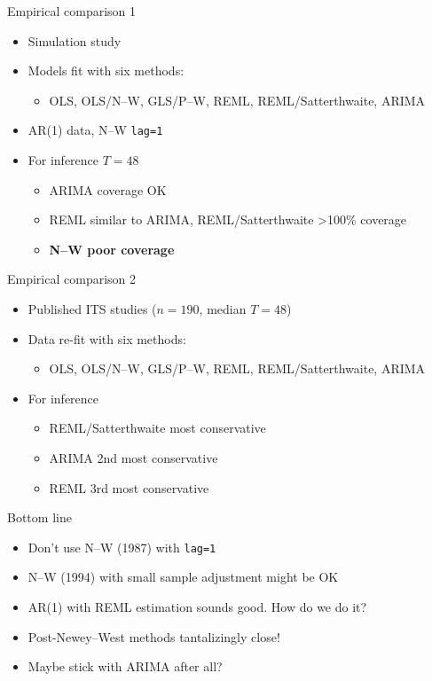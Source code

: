 \documentclass[aspectratio=169,12pt]{beamer} %
\begin{document}
\begin{frame}{Empirical comparison 1}
	\begin{itemize}
		\item Simulation study
		\item Models fit with six methods:
		\begin{itemize}
			\item OLS, OLS/N--W, GLS/P--W, REML, REML/Satterthwaite, ARIMA
		\end{itemize}
		\item AR(1) data, N--W \texttt{lag=1}
		\item For inference \( T=48 \)
		\begin{itemize}
			\item ARIMA coverage OK
			\item REML similar to ARIMA, REML/Satterthwaite >100\% coverage
			\item \textbf{N--W poor coverage}
		\end{itemize}
	\end{itemize}
\end{frame}

\begin{frame}{Empirical comparison 2}
	\begin{itemize}
		\item Published ITS studies (\( n=190 \), median \(T=48\))
		\item Data re-fit with six methods:
		\begin{itemize}
			\item OLS, OLS/N--W, GLS/P--W, REML, REML/Satterthwaite, ARIMA
		\end{itemize}
		\item For inference
		\begin{itemize}
			\item REML/Satterthwaite most conservative
			\item ARIMA 2nd most conservative
			\item REML 3rd most conservative
		\end{itemize}
	\end{itemize}
\end{frame}

\begin{frame}{Bottom line}
    \begin{itemize}
        \item Don't use N--W (1987) with \texttt{lag=1}
        \item N--W (1994) with small sample adjustment might be OK
		\item AR(1) with REML estimation sounds good. How do we do it?
        \item Post-Newey--West methods tantalizingly close!
		\item Maybe stick with ARIMA after all?
    \end{itemize}
\end{frame}
\end{document}
